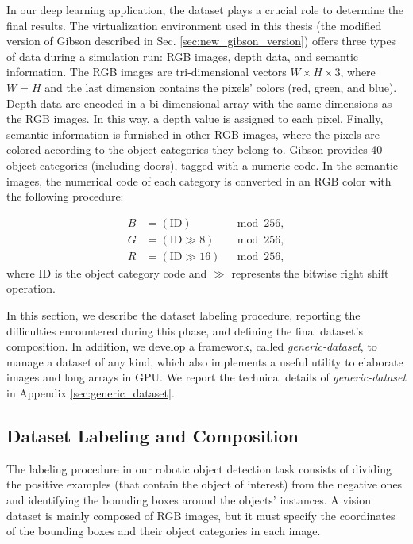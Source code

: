 In our deep learning application, the dataset plays a crucial role to determine the final results. The virtualization environment used in this thesis (the modified version of Gibson described in Sec. \ref{sec:new_gibson_version}) offers three types of data during a simulation run: RGB images, depth data, and semantic information. The RGB images are tri-dimensional vectors $W \times H \times 3$, where $W = H$ and the last dimension contains the pixels' colors (red, green, and blue). Depth data are encoded in a bi-dimensional array with the same dimensions as the RGB images. In this way, a depth value is assigned to each pixel. Finally, semantic information is furnished in other RGB images, where the pixels are colored according to the object categories they belong to. Gibson provides 40 object categories (including doors), tagged with a numeric code. In the semantic images, the numerical code of each category is converted in an RGB color with the following procedure:

\begin{equation}
\label{eq:pareto mle2}
\begin{aligned}
B &= (\text{ID}) &\mod 256, \\
G &= (\text{ID} \gg 8) &\mod 256, \\
R &= (\text{ID} \gg 16) &\mod 256,
\end{aligned}
\end{equation}
where ID is the object category code and $\gg$ represents the bitwise right shift operation. 

In this section, we describe the dataset labeling procedure, reporting the difficulties encountered during this phase, and defining the final dataset's composition. In addition, we develop a framework, called \textit{generic-dataset}, to manage a dataset of any kind, which also implements a useful utility to elaborate images and long arrays in GPU. We report the technical details of \textit{generic-dataset} in Appendix \ref{sec:generic_dataset}.


\subsection{Dataset Labeling and Composition}
\label{sec:dataset_labeling}
The labeling procedure in our robotic object detection task consists of dividing the positive examples (that contain the object of interest) from the negative ones and identifying the bounding boxes around the objects' instances. A vision dataset is mainly composed of RGB images, but it must specify the coordinates of the bounding boxes and their object categories in each image.

